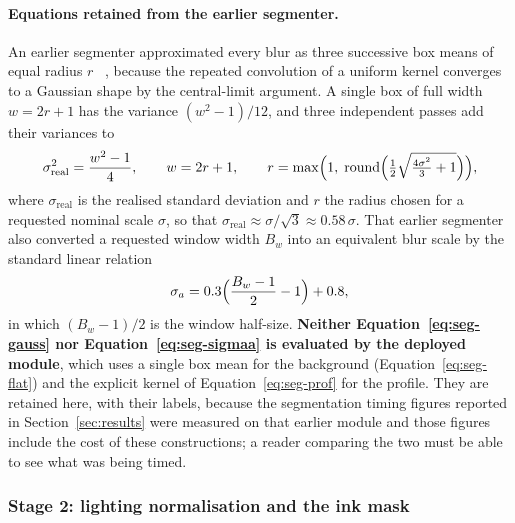 \paragraph{Equations retained from the earlier segmenter.}
An earlier segmenter approximated every blur as three successive box means of equal radius $r$~\cite{wells1986} , because the repeated convolution of a uniform kernel converges to a Gaussian shape by the central-limit argument.
A single box of full width $w=2r+1$ has the variance $(w^2-1)/12$, and three independent passes add their variances to
\begin{equation}
\sigma_{\mathrm{real}}^2=\frac{w^2-1}{4},\qquad w=2r+1,\qquad r=\max\Bigl(1,\;\mathrm{round}\Bigl(\tfrac12\sqrt{\tfrac{4\sigma^2}{3}+1}\Bigr)\Bigr),
\label{eq:seg-gauss}
\end{equation}
where $\sigma_{\mathrm{real}}$ is the realised standard deviation and $r$ the radius chosen for a requested nominal scale $\sigma$, so that $\sigma_{\mathrm{real}}\approx\sigma/\sqrt3\approx0.58\,\sigma$.
That earlier segmenter also converted a requested window width $B_w$ into an equivalent blur scale by the standard linear relation
\begin{equation}
\sigma_a=0.3\Bigl(\frac{B_w-1}{2}-1\Bigr)+0.8,
\label{eq:seg-sigmaa}
\end{equation}
in which $(B_w-1)/2$ is the window half-size.
\textbf{Neither Equation~\ref{eq:seg-gauss} nor Equation~\ref{eq:seg-sigmaa} is evaluated by the deployed module}, which uses a single box mean for the background (Equation~\ref{eq:seg-flat}) and the explicit kernel of Equation~\ref{eq:seg-prof} for the profile.
They are retained here, with their labels, because the segmentation timing figures reported in Section~\ref{sec:results} were measured on that earlier module and those figures include the cost of these constructions; a reader comparing the two must be able to see what was being timed.

\subsubsection{Stage 2: lighting normalisation and the ink mask}

